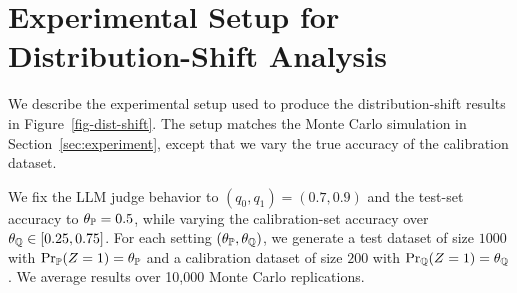 \vspace{32pt}
\section{Experimental Setup for Distribution-Shift Analysis}
\label{sec:appendix:distshift}

We describe the experimental setup used to produce the distribution-shift results in Figure~\ref{fig-dist-shift}.
The setup matches the Monte Carlo simulation in Section~\ref{sec:experiment}, except that we vary the true accuracy of the calibration dataset.

We fix the LLM judge behavior to $(q_0, q_1) = (0.7, 0.9)$ and the test-set accuracy to $\theta_{{\mathbb{P}}} = 0.5$, while varying the calibration-set accuracy over $\theta_{{\mathbb{Q}}} \in [0.25, 0.75]$. For each setting $(\theta_{{\mathbb{P}}}, \theta_{{\mathbb{Q}}})$, we generate a test dataset of size $1000$ with $\mathop{\rm Pr}\nolimits_{{\mathbb{P}}}(Z=1) = \theta_{{\mathbb{P}}}$ and a calibration dataset of size $200$ with $\mathop{\rm Pr}\nolimits_{{\mathbb{Q}}}(Z=1) = \theta_{{\mathbb{Q}}}$. We average results over 10{,}000 Monte Carlo replications.



